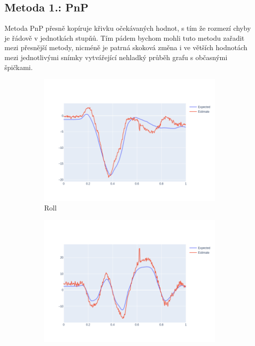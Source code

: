 \documentclass[12pt,a4paper,titlepage,final]{report}
\begin{document}
\subsection{Metoda 1.: PnP}
Metoda PnP přesně kopíruje křivku očekávaných hodnot, s tím že rozmezí chyby je řádově v jednotkách stupňů. Tím pádem bychom mohli tuto metodu zařadit mezi přesnější metody, nicméně je patrná skoková změna i ve větších hodnotách mezi jednotlivými snímky vytvářející nehladký průběh grafu s občasnými špičkami.

\begin{figure}[H]
  \centering
  \captionsetup{justification=centering}
  \begin{subfigure}[b]{0.32\textwidth}
    \includegraphics[width=\textwidth]{images/evaluation/3D_model_roll_user_01_video_07.png}
   \caption{Roll}
    \label{fig:pnp_roll}
  \end{subfigure}
  \hfill
  \begin{subfigure}[b]{0.32\textwidth}
    \includegraphics[width=\textwidth]{images/evaluation/3D_model_yaw_user_01_video_07.png}

\end{subfigure}
\end{figure}
\end{document}
